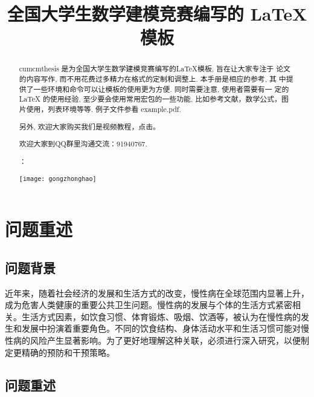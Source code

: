 \documentclass{cumcmthesis}
\title{全国大学生数学建模竞赛编写的 \LaTeX{} 模板}
\begin{document}
 \maketitle
 \begin{abstract}
cumcmthesis 是为全国大学生数学建模竞赛编写的\LaTeX{}模板, 旨在让大家专注于 论文的内容写作, 而不用花费过多精力在格式的定制和调整上. 本手册是相应的参考, 其 中提供了一些环境和命令可以让模板的使用更为方便. 同时需要注意, 使用者需要有一 定的 \LaTeX{} 的使用经验, 至少要会使用常用宏包的一些功能, 比如参考文献，数学公式，图片使用，列表环境等等. 例子文件参看 example.pdf.

另外, 欢迎大家购买我们是视频教程，点击\href{https://item.taobao.com/item.htm?spm=a1z10.1-c.w4004-3473795048.4.ThFQCG&id=43823508044}{}。

欢迎大家到QQ群里沟通交流：91940767.

：

\centerline{\texttt{[image: gongzhonghao]}}

\end{abstract}

\tableofcontents

















\clearpage
\section{问题重述}
\subsection{问题背景}
近年来，随着社会经济的发展和生活方式的改变，慢性病在全球范围内显著上升，成为危害人类健康的重要公共卫生问题。慢性病的发展与个体的生活方式紧密相关。生活方式因素，如饮食习惯、体育锻炼、吸烟、饮酒等，被认为在慢性病的发生和发展中扮演着重要角色。不同的饮食结构、身体活动水平和生活习惯可能对慢性病的风险产生显著影响。为了更好地理解这种关联，必须进行深入研究，以便制定更精确的预防和干预策略。

\subsection{问题重述}
\end{document}

